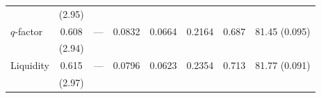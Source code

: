 \begin{table}[htbp]
\begin{tabular}{lccccccc}
 & (2.95) &  & & & & & \\ %
$q$-factor & 0.608 & --- & 0.0832 & 0.0664 & 0.2164 & 0.687 & 81.45 (0.095) \\ %
 & (2.94) &  & & & & & \\ %
Liquidity & 0.615 & --- & 0.0796 & 0.0623 & 0.2354 & 0.713 & 81.77 (0.091) \\ %
 & (2.97) &  & & & & & \\ %
\bottomrule
\end{tabular}
\end{table}
